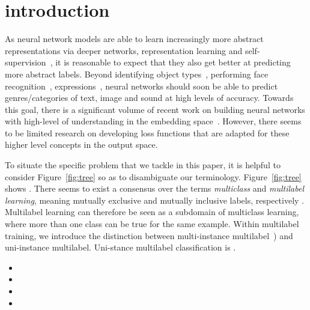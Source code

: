 
\section{introduction}
\label{sec:org662677c}

As neural network models are able to learn increasingly more abstract representations via deeper networks, representation learning and self-supervision~\citep[see, e.g.,][]{XX,YYY,ZZZ}, it is reasonable to expect that they also get better at predicting more abstract labels. 
Beyond identifying object types~, performing face recognition~,  expressions~, neural networks should soon be able to predict genres/categories of text, image and sound at high levels of accuracy. 
Towards this goal, there is a significant volume of recent work on building neural networks with high-level of understanding in the embedding space~.
However, there seems to be limited research on developing loss functions that are adapted for these higher level concepts in the output space.


To situate the specific problem that we tackle in this paper, it is helpful to consider Figure~\ref{fig:tree} so as to disambiguate our terminology. 
Figure~\ref{fig:tree} shows .
There seems to exist a consensus over the terms \emph{multiclass} and \emph{multilabel learning}, meaning mutually exclusive and mutually inclusive labels, respectively . 
Multilabel learning can therefore be seen as a subdomain of multiclass learning, where more than one class can be true for the same example. 
Within multilabel training, we introduce the distinction between multi-instance multilabel~\citep[e.g.,][]{multiInstance}) and uni-instance multilabel. 
Uni-stance multilabel classification is .
\begin{itemize}
\item {}
\item {}
\item {}
\item {}
\end{itemize}

